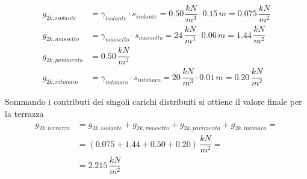 \begin{align*}
 g_{2k, isolante} &= \gamma_{isolante}\cdot s_{isolante} = 0.50\,\dfrac{kN}{m^3}\cdot 0.15\,\si{m} = 0.075\,\dfrac{kN}{m^2}\\
 g_{2k, massetto} &= \gamma_{massetto}\cdot s_{massetto} = 24\,\dfrac{kN}{m^3}\cdot 0.06\,\si{m} = 1.44\,\dfrac{kN}{m^2}\\
 g_{2k, pavimento} &= 0.50\,\dfrac{kN}{m^2}\\
 g_{2k, intonaco} &= \gamma_{intonaco}\cdot s_{intonaco} = 20\,\dfrac{kN}{m^3}\cdot 0.01\,\si{m} = 0.20\,\dfrac{kN}{m^2}
\end{align*}

Sommando i contributi dei singoli carichi distribuiti si ottiene il valore finale per la terrazza
 \begin{align*}
	g_{2k, terrazza} &= g_{2k, isolante} + g_{2k, massetto} + g_{2k, pavimento} + g_{2k, intonaco} =\\ &= (0.075 + 1.44 + 0.50 + 0.20)\,\dfrac{kN}{m^2} =\\&=
	2.215\,\dfrac{kN}{m^2}
 \end{align*}


